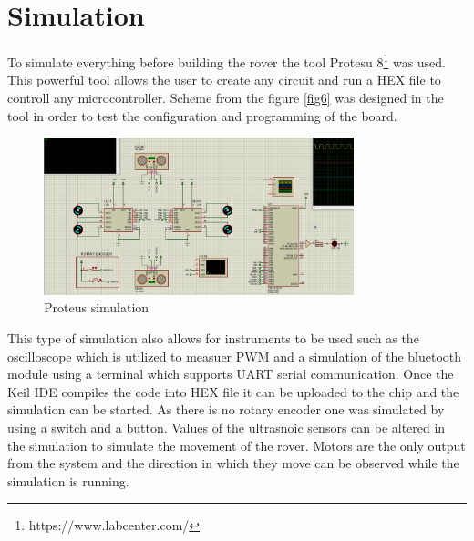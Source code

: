 \section{Simulation}

To simulate everything before building the rover the tool Protesu 8\footnote{https://www.labcenter.com/} was used. This powerful tool allows the user to create any circuit and run a HEX file to controll any microcontroller. Scheme from the figure \ref{fig6} was designed in the tool in order to test the configuration and programming of the board.


\begin{figure}[htbp]
    \centerline{\includegraphics[width=9cm]{Images/Proteus.png}}
    \caption{Proteus simulation}
    \label{fig9}
\end{figure}

This type of simulation also allows for instruments to be used such as the oscilloscope which is utilized to measuer PWM and a simulation of the bluetooth module using a terminal which supports UART serial communication. Once the Keil IDE compiles the code into HEX file it can be uploaded to the chip and the simulation can be started. As there is no rotary encoder one was simulated by using a switch and a button. Values of the ultrasnoic sensors can be altered in the simulation to simulate the movement of the rover. Motors are the only output from the system and the direction in which they move can be observed while the simulation is running.